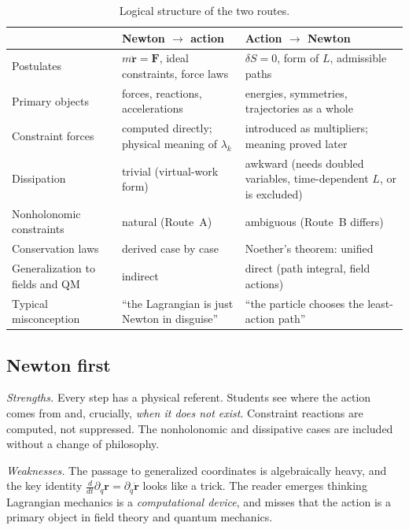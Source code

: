 \begin{table}[ht]
\centering\small
\renewcommand{\arraystretch}{1.25}
\begin{tabular}{@{}p{3.1cm}p{5.6cm}p{5.6cm}@{}}
\toprule
 & \textbf{Newton $\to$ action} & \textbf{Action $\to$ Newton}\\
\midrule
Postulates & $m\ddot{\mathbf r}=\mathbf F$, ideal constraints, force laws &
  $\delta S=0$, form of $L$, admissible paths \\
Primary objects & forces, reactions, accelerations & energies, symmetries, trajectories as a whole \\
Constraint forces & computed directly; physical meaning of $\lambda_k$ & introduced as multipliers; meaning proved later \\
Dissipation & trivial (virtual-work form) & awkward (needs doubled variables, time-dependent $L$, or is excluded) \\
Nonholonomic constraints & natural (Route~A) & ambiguous (Route~B differs) \\
Conservation laws & derived case by case & Noether's theorem: unified \\
Generalization to fields and QM & indirect & direct (path integral, field actions) \\
Typical misconception & ``the Lagrangian is just Newton in disguise'' & ``the particle chooses the least-action path'' \\
\bottomrule
\end{tabular}
\caption{Logical structure of the two routes.}
\label{routes}
\end{table}

\subsection{Newton first}

\emph{Strengths.} Every step has a physical referent. Students see where
the action comes from and, crucially, \emph{when it does not exist}.
Constraint reactions are computed, not suppressed. The nonholonomic
and dissipative cases are included without a change of philosophy.

\emph{Weaknesses.} The passage to generalized coordinates is algebraically
heavy, and the key identity
$\frac{d}{dt}\partial_{q}\mathbf r=\partial_{\dot q}\dot{\mathbf r}$ looks
like a trick. The reader emerges thinking Lagrangian mechanics is a
\emph{computational device}, and misses that the action is a primary
object in field theory and quantum mechanics.

